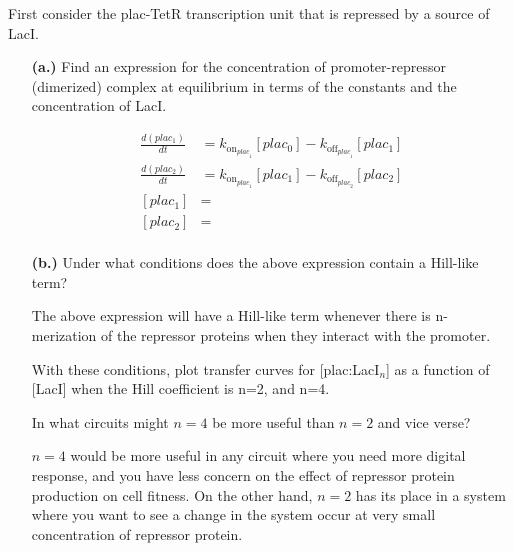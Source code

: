 \documentclass[11pt]{article}
\begin{document}
First consider the plac-TetR transcription unit that is repressed by a source of LacI.
\begin{itemize}

\item[{\bf (a.)}] Find an expression for the concentration of promoter-repressor (dimerized) complex at equilibrium in terms of the constants and the concentration of LacI.

\begin{equation*}
  \begin{align}
    \frac{d(plac_1)}{dt} &= 
    k_{\mbox{on}_{{plac}_1}}[plac_0] - k_{\mbox{off}_{{plac}_1}}[plac_1]\\
    \frac{d(plac_2)}{dt} &= 
    k_{\mbox{on}_{{plac}_1}}[plac_1] - k_{\mbox{off}_{{plac}_2}}[plac_2]\\
    [plac_1] &= \\
    [plac_2] &= \\
  \end{align}
\end{equation*}

\item[{\bf (b.)}] Under what conditions does the above expression contain a Hill-like term?

The above expression will have a Hill-like term whenever there is n-merization of the repressor proteins when they interact with the promoter.
 
With these conditions, plot transfer curves for [plac:LacI$_n$] as a function of [LacI] when the Hill coefficient is n=2, and n=4.


{
 \centering
}

In what circuits might $n=4$ be more useful than $n=2$ and vice verse?

$n=4$ would be more useful in any circuit where you need more digital response, and you have less concern on the effect of repressor protein production on cell fitness.
On the other hand, $n=2$ has its place in a system where you want to see a change in the system occur at very small concentration of repressor protein. 
\end{itemize}
\end{document}
